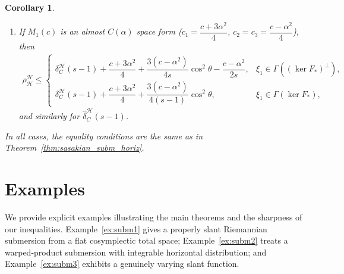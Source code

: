 \documentclass[11pt]{amsart}
\theoremstyle{plain}
\newtheorem{corollary}{Corollary}[section]
\theoremstyle{definition}
\theoremstyle{remark}
\begin{document}
\begin{corollary}
\begin{enumerate}
    \item If $M_1(c)$ is an almost $C(\alpha)$ space form 
    ($c_1=\dfrac{c+3\alpha^2}{4}$, 
    $c_2=c_3=\dfrac{c-\alpha^2}{4}$), then
    \begin{align*}
    \rho_{\mathcal{H}}^{\mathcal{H}} \le 
    \begin{cases}
    \delta_C^{\mathcal{H}}(s-1) + \dfrac{c+3\alpha^2}{4} 
    + \dfrac{3(c-\alpha^2)}{4s}\cos^2\theta 
    - \dfrac{c-\alpha^2}{2s}, 
    & \xi_1 \in \Gamma((\ker F_*)^{\perp}),\\[8pt]
    \delta_C^{\mathcal{H}}(s-1) + \dfrac{c+3\alpha^2}{4} 
    + \dfrac{3(c-\alpha^2)}{4(s-1)}\cos^2\theta,
    & \xi_1 \in \Gamma(\ker F_*),
    \end{cases}
    \end{align*}
    and similarly for $\hat{\delta}_C^{\mathcal{H}}(s-1)$.
\end{enumerate}
In all cases, the equality conditions are the same as in 
Theorem~\ref{thm:sasakian_subm_horiz}.
\end{corollary}


\section{Examples}\label{sec:examples}

We provide explicit examples illustrating the main theorems and the sharpness of
our inequalities. Example~\ref{ex:subm1} gives a properly slant Riemannian
submersion from a flat cosymplectic total space; Example~\ref{ex:subm2} treats a
warped-product submersion with integrable horizontal distribution; and
Example~\ref{ex:subm3} exhibits a genuinely varying slant function.
\end{document}

